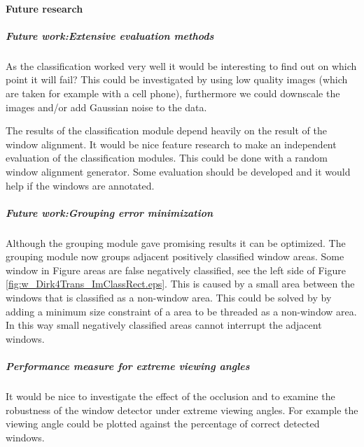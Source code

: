 \paragraph{Future research} %
\label{sec:futureResearchWindowClassification}
\subparagraph{Future work:Extensive evaluation methods}
As the classification worked very well it would be interesting to find out on which
point it will fail?  This could be investigated by using low quality images (which are taken for
example with a cell phone), furthermore we could downscale the images and/or add
Gaussian noise to the data.\\

The results of the classification module depend heavily on the result of the
window alignment. It would be nice feature research to make an independent
evaluation of the classification modules.  This could be done with a random
window alignment generator. Some evaluation should be developed and it would
help if the windows are annotated.

\subparagraph{Future work:Grouping error minimization}
Although the grouping module gave promising results it can be optimized.  The
grouping module now groups adjacent positively classified window areas.  Some
window in Figure areas are false negatively classified, see the left side of
Figure \ref{fig:w_Dirk4Trans_ImClassRect.eps}.  This is caused by a small area
between the windows that is classified as a non-window area. This could be
solved by by adding a minimum size constraint of a area to be threaded as a
non-window area.  In this way small negatively classified areas cannot interrupt
the adjacent windows.

\subparagraph{Performance measure for extreme viewing angles}
It would be nice to investigate the effect of the occlusion and to examine the
robustness of the window detector under extreme viewing angles.
For example the viewing angle could be plotted against the percentage of
correct detected windows.







